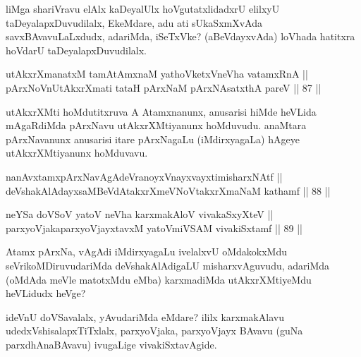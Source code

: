 \begin{artha}
liMga shariVravu elAlx kaDeyalUlx hoVgutatxlidadxrU elilxyU
taDeyalapxDuvudilalx, EkeMdare, adu ati sUkaSxmXvAda
savxBAvavuLaLxdudx, adariMda, iSeTxVke? (aBeVdayxvAda) loVhada
hatitxra hoVdarU taDeyalapxDuvudilalx.
\end{artha}


\begin{shl}
utAkxrXmanatxM tamAtAmxnaM yathoVketxVneVha vatamxRnA || \\
pArxNoV\s nUtAkxrXmati tataH pArxNaM pArxNAsatxthA pareV \hfill || 87 ||  
\end{shl}

\begin{artha}
utAkxrXMti hoMdutitxruva A Atamxnanunx, anusarisi hiMde heVLida
mAgaRdiMda pArxNavu utAkxrXMtiyanunx hoMduvudu. anaMtara pArxNavanunx
anusarisi itare pArxNagaLu (iMdirxyagaLa) hAgeye utAkxrXMtiyanunx hoMduvavu.
\end{artha}


\begin{shl}
nanAvxtamxpArxNavAgAdeVranoyxVnayxvayxtimisharxNAtf || \\
deVshakAlAdayxsaMBeVdAtakxrXmeVNoVtakxrXmaNaM kathamf \hfill || 88 || 
\end{shl}

\begin{shl}
neYSa doVSoV yatoV neVha karxmakAloV vivakaSxyXteV || \\
parxyoVjakaparxyoVjayxtavxM yatoV\s miVSAM vivakiSxtamf \hfill || 89 ||  
\end{shl}

\begin{artha}
Atamx pArxNa, vAgAdi iMdirxyagaLu ivelalxvU oMdakokxMdu
seVrikoMDiruvudariMda deVshakAlAdigaLU misharxvAguvudu, adariMda
(oMdAda meVle matotxMdu eMba) karxmadiMda utAkxrXMtiyeMdu heVLidudx
heVge?
\end{artha}

\begin{artha}
ideVnU doVSavalalx, yAvudariMda eMdare? ililx karxmakAlavu
udedxVshisalapxTiTxlalx, parxyoVjaka, parxyoVjayx BAvavu (guNa
parxdhAnaBAvavu) ivugaLige vivakiSxtavAgide.
\end{artha}

